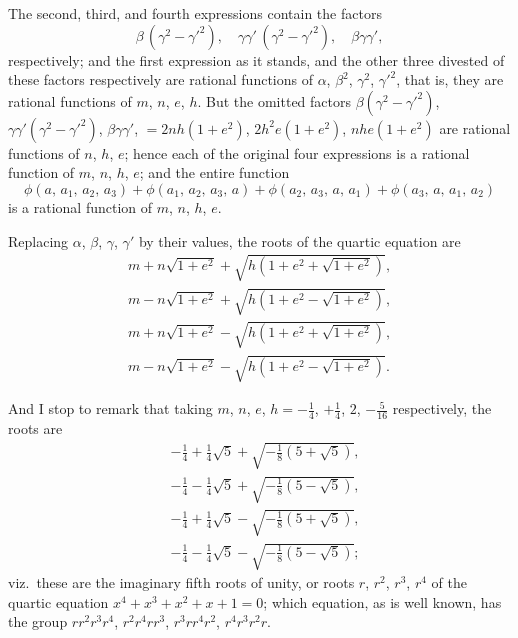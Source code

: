 \documentclass[11pt]{article}
\begin{document}
The second, third, and fourth expressions contain the factors
\[
   \beta\,(\gamma^2 - \gamma'^2),\quad \gamma\gamma'\,(\gamma^2 - \gamma'^2),\quad \beta\gamma\gamma',
\]
respectively; and the first expression as it stands, and the other three divested of
these factors respectively are rational functions of $\alpha$, $\beta^2$, $\gamma^2$, $\gamma'^2$, that is, they are
rational functions of $m$, $n$, $e$, $h$. But the omitted factors $\beta(\gamma^2 - \gamma'^2)$, $\gamma\gamma'(\gamma^2 - \gamma'^2)$,
$\beta\gamma\gamma'$, $= 2nh(1+e^2)$, $2h^2 e(1+e^2)$, $nhe(1+e^2)$ are rational functions of $n$, $h$, $e$; hence
each of the original four expressions is a rational function of $m$, $n$, $h$, $e$; and the
entire function
\[
   \phi(a,\, a_1,\, a_2,\, a_3) + \phi(a_1,\, a_2,\, a_3,\, a) + \phi(a_2,\, a_3,\, a,\, a_1) + \phi(a_3,\, a,\, a_1,\, a_2)
\]
is a rational function of $m$, $n$, $h$, $e$.

Replacing $\alpha$, $\beta$, $\gamma$, $\gamma'$ by their values, the roots of the quartic equation are
\begin{align*}
   m + n\sqrt{1 + e^2} + \sqrt{h(1 + e^2 + \sqrt{1 + e^2})},\\
   m - n\sqrt{1 + e^2} + \sqrt{h(1 + e^2 - \sqrt{1 + e^2})},\\
   m + n\sqrt{1 + e^2} - \sqrt{h(1 + e^2 + \sqrt{1 + e^2})},\\
   m - n\sqrt{1 + e^2} - \sqrt{h(1 + e^2 - \sqrt{1 + e^2})}.
\end{align*}

And I stop to remark that taking $m$, $n$, $e$, $h = -\tfrac{1}{4}$, $+\tfrac{1}{4}$, $2$, $-\tfrac{5}{16}$ respectively, the
roots are
\begin{align*}
   &-\tfrac{1}{4} + \tfrac{1}{4}\sqrt{5} + \sqrt{-\tfrac{1}{8}(5 + \sqrt{5})},\\
   &-\tfrac{1}{4} - \tfrac{1}{4}\sqrt{5} + \sqrt{-\tfrac{1}{8}(5 - \sqrt{5})},\\
   &-\tfrac{1}{4} + \tfrac{1}{4}\sqrt{5} - \sqrt{-\tfrac{1}{8}(5 + \sqrt{5})},\\
   &-\tfrac{1}{4} - \tfrac{1}{4}\sqrt{5} - \sqrt{-\tfrac{1}{8}(5 - \sqrt{5})};
\end{align*}
viz.\ these are the imaginary fifth roots of unity, or roots $r$, $r^2$, $r^3$, $r^4$ of the quartic
equation $x^4 + x^3 + x^2 + x + 1 = 0$; which equation, as is well known, has the group
$r r^2 r^3 r^4$, $r^2 r^4 r r^3$, $r^3 r r^4 r^2$, $r^4 r^3 r^2 r$.
\end{document}
